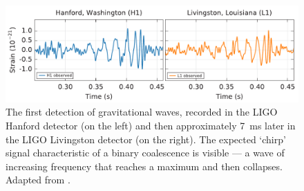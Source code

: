\begin{colsection}
\begin{colsection}
\begin{figure}[t]
    \begin{center}
        \includegraphics[width=\linewidth]{images/chirp.pdf}
    \end{center}
    \caption[The first detection of gravitational waves]{
        The first detection of gravitational waves, recorded in the LIGO Hanford detector (on the left) and then approximately \SI{7}{\milli\second} later in the LIGO Livingston detector (on the right). The expected `chirp' signal characteristic of a binary coalescence is visible --- a wave of increasing frequency that reaches a maximum and then collapses. Adapted from \citet{GW150914}.
        }\label{fig:chirp}
\end{figure}

\end{colsection}


\end{colsection}


\newpage
